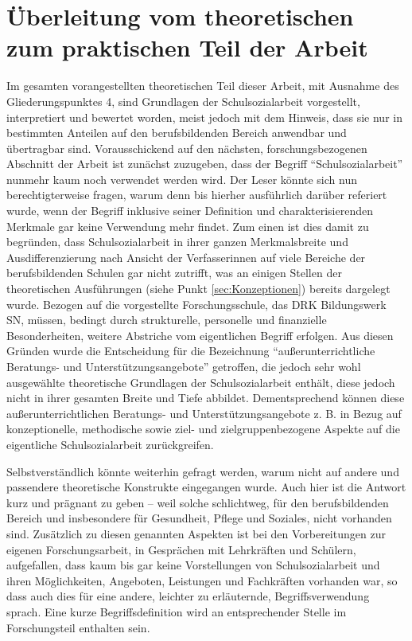 \section{Überleitung vom theoretischen zum praktischen Teil der Arbeit}
\label{sec:ÜberleitungVomTheoretischenZumPraktischenTeilDerArbeit}

Im gesamten vorangestellten theoretischen Teil dieser Arbeit, mit Ausnahme des Gliederungspunktes 4, sind Grundlagen der Schulsozialarbeit vorgestellt, interpretiert und bewertet worden, meist jedoch mit dem Hinweis, dass sie nur in bestimmten Anteilen auf den berufsbildenden Bereich anwendbar und übertragbar sind. Vorausschickend auf den nächsten, forschungsbezogenen Abschnitt der Arbeit ist zunächst zuzugeben, dass der Begriff "`Schulsozialarbeit"' nunmehr kaum noch verwendet werden wird. Der Leser könnte sich nun berechtigterweise fragen, warum denn bis hierher ausführlich darüber referiert wurde, wenn der Begriff inklusive seiner Definition und charakterisierenden Merkmale gar keine Verwendung mehr findet. Zum einen ist dies damit zu begründen, dass Schulsozialarbeit in ihrer ganzen Merkmalsbreite und Ausdifferenzierung nach Ansicht der Verfasserinnen auf viele Bereiche der berufsbildenden Schulen gar nicht zutrifft, was an einigen Stellen der theoretischen Ausführungen (siehe Punkt \ref{sec:Konzeptionen}) bereits dargelegt wurde. Bezogen auf die vorgestellte Forschungsschule, das DRK Bildungswerk SN, müssen, bedingt durch strukturelle, personelle und finanzielle Besonderheiten, weitere Abstriche vom eigentlichen Begriff erfolgen. Aus diesen Gründen wurde die Entscheidung für die Bezeichnung "`außerunterrichtliche Beratungs- und Unterstützungsangebote"' getroffen, die jedoch sehr wohl ausgewählte theoretische Grundlagen der Schulsozialarbeit enthält, diese jedoch nicht in ihrer gesamten Breite und Tiefe abbildet. Dementsprechend können diese außerunterrichtlichen Beratungs- und Unterstützungsangebote z. B. in Bezug auf konzeptionelle, methodische sowie ziel- und zielgruppenbezogene Aspekte auf die eigentliche Schulsozialarbeit zurückgreifen. 

Selbstverständlich könnte weiterhin gefragt werden, warum nicht auf andere und passendere theoretische Konstrukte eingegangen wurde. Auch hier ist die Antwort kurz und prägnant zu geben -- weil solche schlichtweg, für den berufsbildenden Bereich und insbesondere für Gesundheit, Pflege und Soziales, nicht vorhanden sind. Zusätzlich zu diesen genannten Aspekten ist bei den Vorbereitungen zur eigenen Forschungsarbeit, in Gesprächen mit Lehrkräften und Schülern, aufgefallen, dass kaum bis gar keine Vorstellungen von Schulsozialarbeit und ihren Möglichkeiten, Angeboten, Leistungen und Fachkräften vorhanden war, so dass auch dies für eine andere, leichter zu erläuternde, Begriffsverwendung sprach. Eine kurze Begriffsdefinition wird an entsprechender Stelle im Forschungsteil enthalten sein. 

